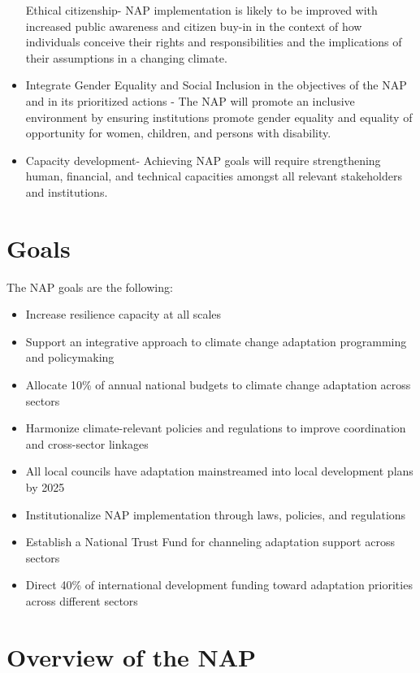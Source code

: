 \documentclass[
]{book}
\providecommand{\tightlist}{%
  \setlength{\itemsep}{0pt}\setlength{\parskip}{0pt}}
\begin{document}
\begin{itemize}
  Ethical citizenship- NAP implementation is likely to be improved with increased public awareness and citizen buy-in in the context of how individuals conceive their rights and responsibilities and the implications of their assumptions in a changing climate.
\item
  Integrate Gender Equality and Social Inclusion in the objectives of the NAP and in its prioritized actions - The NAP will promote an inclusive environment by ensuring institutions promote gender equality and equality of opportunity for women, children, and persons with disability.
\item
  Capacity development- Achieving NAP goals will require strengthening human, financial, and technical capacities amongst all relevant stakeholders and institutions.
\end{itemize}

\hypertarget{goals}{%
\section{Goals}\label{goals}}

The NAP goals are the following:

\begin{itemize}
\tightlist
\item
  Increase resilience capacity at all scales
\item
  Support an integrative approach to climate change adaptation programming and policymaking
\item
  Allocate 10\% of annual national budgets to climate change adaptation across sectors
\item
  Harmonize climate-relevant policies and regulations to improve coordination and cross-sector linkages
\item
  All local councils have adaptation mainstreamed into local development plans by 2025
\item
  Institutionalize NAP implementation through laws, policies, and regulations
\item
  Establish a National Trust Fund for channeling adaptation support across sectors
\item
  Direct 40\% of international development funding toward adaptation priorities across different sectors
\end{itemize}

\hypertarget{overview-of-the-nap}{%
\section{Overview of the NAP}\label{overview-of-the-nap}}
\end{document}
